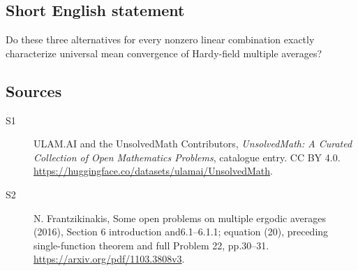 \documentclass[11pt]{article}
\begin{document}
\subsection{Short English statement}
Do these three alternatives for every nonzero linear combination exactly characterize universal mean convergence of Hardy-field multiple averages?
\subsection{Sources}
\begin{description}
\item[\hypertarget{source:statement:1}{S1}] ULAM.AI and the UnsolvedMath Contributors, \emph{UnsolvedMath: A Curated Collection of Open Mathematics Problems}, catalogue entry. CC BY 4.0. \url{https://huggingface.co/datasets/ulamai/UnsolvedMath}.
\item[\hypertarget{source:statement:2}{S2}] N. Frantzikinakis, Some open problems on multiple ergodic averages (2016), Section 6 introduction and6.1--6.1.1; equation (20), preceding single-function theorem and full Problem 22, pp.30--31. \url{https://arxiv.org/pdf/1103.3808v3}.
\end{description}
\label{end:statement}
\end{document}
